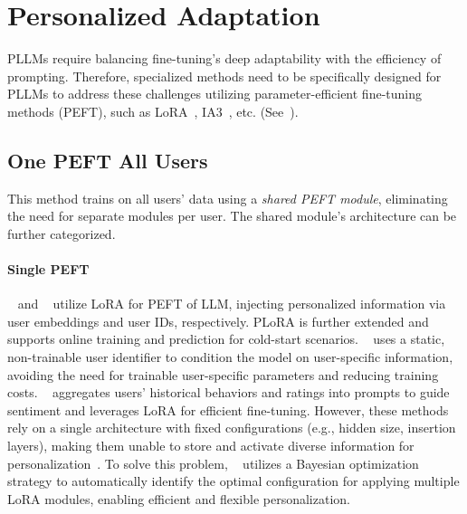 \section{Personalized Adaptation}
\label{sec: personalized adatation}

PLLMs require balancing fine-tuning's deep adaptability with the efficiency of prompting.
Therefore, specialized methods need to be specifically designed for PLLMs to address these challenges utilizing parameter-efficient fine-tuning methods (PEFT),  such as LoRA~\citep{hu2021lora, yang2024low}, IA3~\citep{liu2022few}, etc.  (See~). 


\subsection{One PEFT All Users}
\label{subsec:one4all}

This method trains on all users' data using a \textit{shared PEFT module}, eliminating the need for separate modules per user. The shared module's architecture can be further categorized.



\paragraph{Single PEFT} 
~\citep{DBLP:conf/aaai/ZhangWYXZ24} and ~\citep{wozniak2024personalized} 
utilize LoRA for PEFT of LLM, injecting personalized information via user embeddings and user IDs, respectively. PLoRA is further extended and supports online training and prediction for cold-start scenarios. ~\citep{mireshghallah2021useridentifier} uses a static, non-trainable user identifier to condition the model on user-specific information, avoiding the need for trainable user-specific parameters and reducing training costs. 
~\citep{peng2024llm} aggregates users' historical behaviors and ratings into prompts to guide sentiment and leverages LoRA for efficient fine-tuning.
However, these methods rely on a single architecture with fixed configurations (e.g., hidden size, insertion layers), making them unable to store and activate diverse information for personalization~\citep{zhou2024autopeft}. To solve this problem,
~\citep{zhang2024personalized} utilizes a Bayesian optimization strategy to automatically identify the optimal configuration for applying multiple LoRA modules, enabling efficient and flexible personalization.



